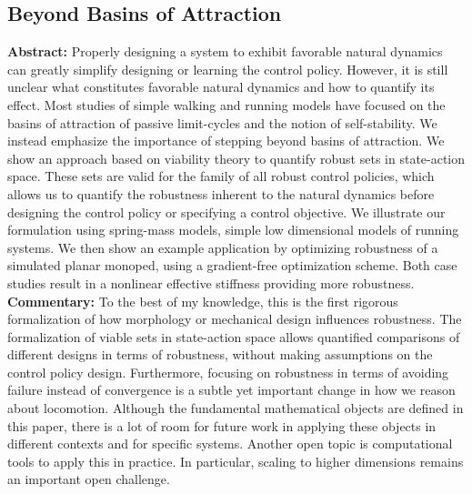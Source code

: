 \subsection{Beyond Basins of Attraction}
\textbf{Abstract: }
Properly designing a system to exhibit favorable natural dynamics can greatly simplify designing or learning the control policy. However, it is still unclear what constitutes favorable natural dynamics and how to quantify its effect. Most studies of simple walking and running models have focused on the basins of attraction of passive limit-cycles and the notion of self-stability. We instead emphasize the importance of stepping beyond basins of attraction. We show an approach based on viability theory to quantify robust sets in state-action space. These sets are valid for the family of all robust control policies, which allows us to quantify the robustness inherent to the natural dynamics before designing the control policy or specifying a control objective.
We illustrate our formulation using spring-mass models, simple low dimensional models of running systems. We then show an example application by optimizing robustness of a simulated planar monoped, using a gradient-free optimization scheme. Both case studies result in a nonlinear effective stiffness providing more robustness. \\
\textbf{Commentary: }
To the best of my knowledge, this is the first rigorous formalization of how morphology or mechanical design influences robustness. The formalization of viable sets in state-action space allows quantified comparisons of different designs in terms of robustness, without making assumptions on the control policy design. Furthermore, focusing on robustness in terms of avoiding failure instead of convergence is a subtle yet important change in how we reason about locomotion. Although the fundamental mathematical objects are defined in this paper, there is a lot of room for future work in applying these objects in different contexts and for specific systems. Another open topic is computational tools to apply this in practice. In particular, scaling to higher dimensions remains an important open challenge. %

